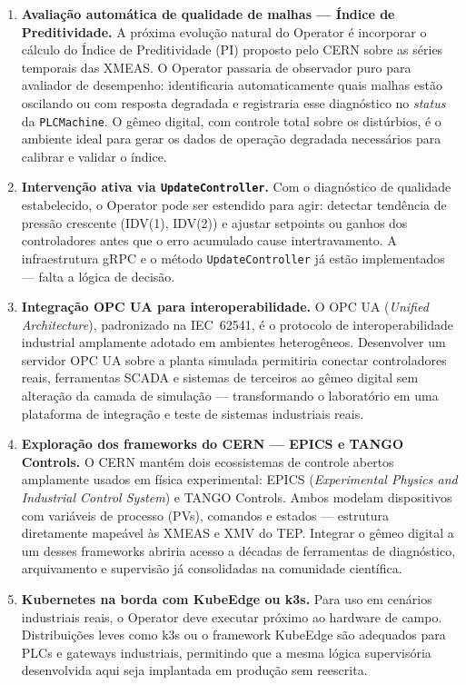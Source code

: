 \begin{enumerate}

  \item \textbf{Avaliação automática de qualidade de malhas — Índice de Preditividade.}
  A próxima evolução natural do Operator é incorporar o cálculo do Índice de Preditividade (PI) proposto pelo CERN \cite{CERN_WEAPL02} sobre as séries temporais das XMEAS. O Operator passaria de observador puro para avaliador de desempenho: identificaria automaticamente quais malhas estão oscilando ou com resposta degradada e registraria esse diagnóstico no \textit{status} da \texttt{PLCMachine}. O gêmeo digital, com controle total sobre os distúrbios, é o ambiente ideal para gerar os dados de operação degradada necessários para calibrar e validar o índice.

  \item \textbf{Intervenção ativa via \texttt{UpdateController}.}
  Com o diagnóstico de qualidade estabelecido, o Operator pode ser estendido para agir: detectar tendência de pressão crescente (IDV(1), IDV(2)) e ajustar setpoints ou ganhos dos controladores antes que o erro acumulado cause intertravamento. A infra\-estrutura gRPC e o método \texttt{UpdateController} já estão implementados — falta a lógica de decisão.

  \item \textbf{Integração OPC UA para interoperabilidade.}
  O OPC UA (\textit{Unified Architecture}), padronizado na IEC~62541, é o protocolo de interoperabilidade industrial amplamente adotado em ambientes heterogêneos. Desenvolver um servidor OPC UA sobre a planta simulada permitiria conectar controladores reais, ferramentas SCADA e sistemas de terceiros ao gêmeo digital sem alteração da camada de simulação — transformando o laboratório em uma plataforma de integração e teste de sistemas industriais reais.

  \item \textbf{Exploração dos frameworks do CERN — EPICS e TANGO Controls.}
  O CERN mantém dois ecossistemas de controle abertos amplamente usados em física experimental: EPICS (\textit{Experimental Physics and Industrial Control System}) e TANGO Controls. Ambos modelam dispositivos com variáveis de processo (PVs), comandos e estados — estrutura diretamente mapeável às XMEAS e XMV do TEP. Integrar o gêmeo digital a um desses frameworks abriria acesso a décadas de ferramentas de diagnóstico, arquivamento e supervisão já consolidadas na comunidade científica.

  \item \textbf{Kubernetes na borda com KubeEdge ou k3s.}
  Para uso em cenários industriais reais, o Operator deve executar próximo ao hardware de campo. Distribuições leves como k3s ou o framework KubeEdge são adequados para PLCs e gateways industriais, permitindo que a mesma lógica supervisória desenvolvida aqui seja implantada em produção sem reescrita.


\end{enumerate}
